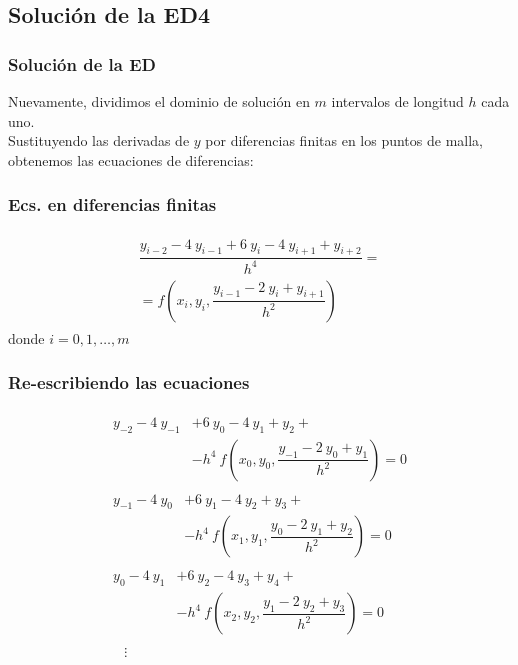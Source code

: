 \subsection{Solución de la ED4}
\begin{frame}
\frametitle{Solución de la ED}
Nuevamente, dividimos el dominio de solución en $m$ intervalos de longitud $h$ cada uno.
\\
\bigskip
Sustituyendo las derivadas de $y$ por diferencias finitas en los puntos de malla, obtenemos las ecuaciones de diferencias:
\end{frame}
\begin{frame}
\frametitle{Ecs. en diferencias finitas}
\begin{align}
\begin{aligned}
\dfrac{y_{i-2} - 4 \: y_{i-1} + 6 \: y_{i} - 4 \: y_{i+1} + y_{i+2}}{h^{4}} = \\
= f \left( x_{i} , y_{i}, \dfrac{y_{i-1} - 2 \: y_{i} + y_{i+1}}{h^{2}} \right)
\end{aligned}
\label{eq:ecuacion_08_12}
\end{align}
donde $i = 0, 1, \ldots, m$
\end{frame}
\begin{frame}
\frametitle{Re-escribiendo las ecuaciones}
\fontsize{12}{12}\selectfont
\begin{align}
\begin{aligned}
y_{-2} - 4 \: y_{-1} &+ 6 \: y_{0} - 4 \: y_{1} + y_{2} + \\
&- h^{4} \: f \left( x_{0}, y_{0}, \dfrac{y_{-1} - 2 \: y_{0} + y_{1}}{h^{2}} \right) = 0 \label{eq:ecuacion_08_13a}
\end{aligned} \\
\begin{aligned}
 y_{-1} - 4 \: y_{0} &+ 6 \: y_{1} - 4 \: y_{2} + y_{3} + \\
&- h^{4} \: f \left( x_{1}, y_{1}, \dfrac{y_{0} - 2 \: y_{1} + y_{2}}{h^{2}} \right) = 0 \label{eq:ecuacion_08_13b}
\end{aligned} \\
\begin{aligned}
y_{0} - 4 \: y_{1} &+ 6 \: y_{2} - 4 \: y_{3} + y_{4} + \\
&- h^{4} \: f \left( x_{2}, y_{2}, \dfrac{y_{1} - 2 \: y_{2} + y_{3}}{h^{2}} \right) = 0 \label{eq:ecuacion_08_13c}
\end{aligned} \\
\begin{aligned}
&{} \vdots  \nonumber
\end{aligned}
\end{align}
\end{frame}
